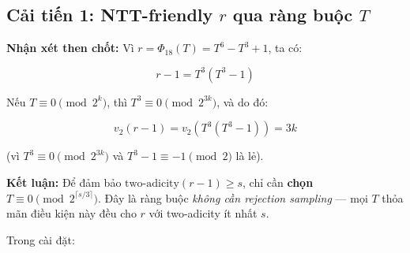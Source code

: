 \subsection{\texorpdfstring{Cải tiến 1: NTT-friendly \(r\) qua ràng buộc
\(T\)}{Cải tiến 1: NTT-friendly r qua ràng buộc T}}\label{cux1ea3i-tiux1ebfn-1-ntt-friendly-r-qua-ruxe0ng-buux1ed9c-t}

\textbf{Nhận xét then chốt:} Vì \(r = \Phi_{18}(T) = T^6 - T^3 + 1\), ta
có:

\[r - 1 = T^3(T^3 - 1)\]

Nếu \(T \equiv 0 \pmod{2^k}\), thì \(T^3 \equiv 0 \pmod{2^{3k}}\), và do
đó:

\[v_2(r-1) = v_2(T^3(T^3 - 1)) = 3k\]

(vì \(T^3 \equiv 0 \pmod{2^{3k}}\) và \(T^3 - 1 \equiv -1 \pmod{2}\) là
lẻ).

\textbf{Kết luận:} Để đảm bảo \(\text{two-adicity}(r-1) \geq s\), chỉ
cần \textbf{chọn \(T \equiv 0 \pmod{2^{\lceil s/3 \rceil}}\)}. Đây là
ràng buộc \emph{không cần rejection sampling} --- mọi \(T\) thỏa mãn
điều kiện này đều cho \(r\) với two-adicity ít nhất \(s\).

Trong cài đặt:

\begin{Shaded}
\begin{Highlighting}[]
\OperatorTok{=}\NormalTok{)}\OperatorTok{;}
\OperatorTok{=}  \NormalTok{)}\OperatorTok{;}
\OperatorTok{=}\OperatorTok{+} \OperatorTok{\&}\OperatorTok{*}\OperatorTok{;}
\OperatorTok{=}\OperatorTok{\&}\OperatorTok{;}
\end{Highlighting}
\end{Shaded}

\label{lst:ch3_t_constraint}\vspace{12pt}

